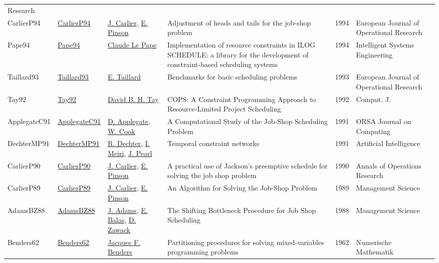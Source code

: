 {\begin{longtable}{llp{5cm}p{10cm}rp{3cm}l}
Research & \cite{KolischS97}\\CarlierP94 & \href{http://dx.doi.org/10.1016/0377-2217(94)90379-4}{CarlierP94} & \hyperref[auth:a859]{J. Carlier}, \hyperref[auth:a860]{E. Pinson} & Adjustment of heads and tails for the job-shop problem & 1994 & European Journal of Operational Research & \cite{CarlierP94}\\Pape94 & \href{http://dx.doi.org/10.1049/ise.1994.0009}{Pape94} & \hyperref[auth:a164]{Claude Le Pape} & Implementation of resource constraints in ILOG SCHEDULE: a library for the development of constraint-based scheduling systems & 1994 & Intelligent Systems Engineering & \cite{Pape94}\\Taillard93 & \href{http://dx.doi.org/10.1016/0377-2217(93)90182-m}{Taillard93} & \hyperref[auth:a872]{E. Taillard} & Benchmarks for basic scheduling problems & 1993 & European Journal of Operational Research & \cite{Taillard93}\\Tay92 & \href{}{Tay92} & \hyperref[auth:a711]{David B. H. Tay} & {COPS:} {A} Constraint Programming Approach to Resource-Limited Project Scheduling & 1992 & Comput. J. & \cite{Tay92}\\ApplegateC91 & \href{http://dx.doi.org/10.1287/ijoc.3.2.149}{ApplegateC91} & \hyperref[auth:a877]{D. Applegate}, \hyperref[auth:a878]{W. Cook} & A Computational Study of the Job-Shop Scheduling Problem & 1991 & ORSA Journal on Computing & \cite{ApplegateC91}\\DechterMP91 & \href{http://dx.doi.org/10.1016/0004-3702(91)90006-6}{DechterMP91} & \hyperref[auth:a302]{R. Dechter}, \hyperref[auth:a873]{I. Meiri}, \hyperref[auth:a874]{J. Pearl} & Temporal constraint networks & 1991 & Artificial Intelligence & \cite{DechterMP91}\\CarlierP90 & \href{http://dx.doi.org/10.1007/bf03543071}{CarlierP90} & \hyperref[auth:a859]{J. Carlier}, \hyperref[auth:a860]{E. Pinson} & A practical use of Jackson's preemptive schedule for solving the job shop problem & 1990 & Annals of Operations Research & \cite{CarlierP90}\\CarlierP89 & \href{http://dx.doi.org/10.1287/mnsc.35.2.164}{CarlierP89} & \hyperref[auth:a859]{J. Carlier}, \hyperref[auth:a860]{E. Pinson} & An Algorithm for Solving the Job-Shop Problem & 1989 & Management Science & \cite{CarlierP89}\\AdamsBZ88 & \href{http://dx.doi.org/10.1287/mnsc.34.3.391}{AdamsBZ88} & \hyperref[auth:a882]{J. Adams}, \hyperref[auth:a883]{E. Balas}, \hyperref[auth:a884]{D. Zawack} & The Shifting Bottleneck Procedure for Job Shop Scheduling & 1988 & Management Science & \cite{AdamsBZ88}\\Benders62 & \href{http://dx.doi.org/10.1007/bf01386316}{Benders62} & \hyperref[auth:a879]{Jacques F. Benders} & Partitioning procedures for solving mixed-variables programming problems & 1962 & Numerische Mathematik & \cite{Benders62}\\\end{longtable}
}

